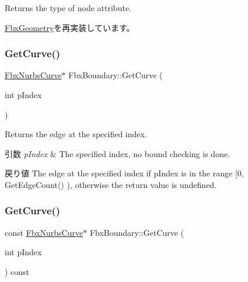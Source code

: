 Returns the type of node attribute. 



\hyperlink{class_fbx_geometry_a41ae23e5d0cf08693bca49737f333de9}{Fbx\+Geometry}を再実装しています。

\mbox{\label{class_fbx_boundary_acbf7b338d8b90d6cd52e7c39faa8b648}} 
\subsubsection{\texorpdfstring{Get\+Curve()}{GetCurve()}\hspace{0.1cm}{\footnotesize\ttfamily [1/2]}}
{\footnotesize\ttfamily \hyperlink{class_fbx_nurbs_curve}{Fbx\+Nurbs\+Curve}$\ast$ Fbx\+Boundary\+::\+Get\+Curve (\begin{DoxyParamCaption}\item[{int}]{p\+Index }\end{DoxyParamCaption})}

Returns the edge at the specified index. 
\begin{DoxyParams}{引数}
{\em p\+Index} & The specified index, no bound checking is done. \\
\hline
\end{DoxyParams}
\begin{DoxyReturn}{戻り値}
The edge at the specified index if p\+Index is in the range \mbox{[}0, Get\+Edge\+Count() ), otherwise the return value is undefined. 
\end{DoxyReturn}
\mbox{\label{class_fbx_boundary_a1f9aac3b37beac6639afa97c79e45358}} 
\subsubsection{\texorpdfstring{Get\+Curve()}{GetCurve()}\hspace{0.1cm}{\footnotesize\ttfamily [2/2]}}
{\footnotesize\ttfamily const \hyperlink{class_fbx_nurbs_curve}{Fbx\+Nurbs\+Curve}$\ast$ Fbx\+Boundary\+::\+Get\+Curve (\begin{DoxyParamCaption}\item[{int}]{p\+Index }\end{DoxyParamCaption}) const}

